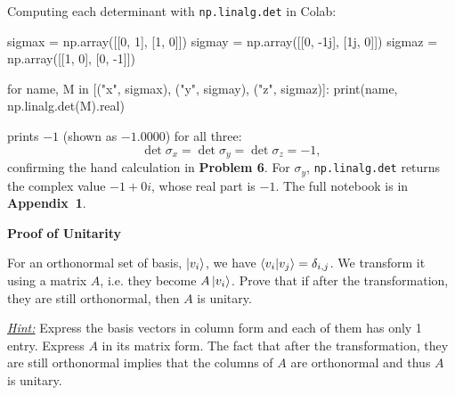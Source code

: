 \documentclass[a4paper, 10pt]{article}
\begin{document}
\begin{solution}
	\noindent Computing each determinant with \texttt{np.linalg.det} in Colab:
	\begin{codingbox}
sigmax = np.array([[0,  1], [1,  0]])
sigmay = np.array([[0, -1j], [1j, 0]])
sigmaz = np.array([[1,  0], [0, -1]])

for name, M in [("x", sigmax), ("y", sigmay), ("z", sigmaz)]:
    print(name, np.linalg.det(M).real)
\end{codingbox}
	\noindent prints \( -1 \) (shown as \( -1.0000 \)) for all three:
	\[
		\det \sigma_x = \det \sigma_y = \det \sigma_z = -1,
	\]
	confirming the hand calculation in \textbf{Problem 6}.
	For \( \sigma_y \), \texttt{np.linalg.det} returns the complex value \( -1 + 0i \), whose real part is \( -1 \).
	The full notebook is in \textbf{Appendix~1}.
\end{solution}

\newpage

\begin{problem}
\textbf{Proof of Unitarity}
\par For an orthonormal set of basis, \( \ket{v_i} \), we have \( \braket{v_i \vert v_j} = \delta_{i,j} \).
We transform it using a matrix \( A \), i.e. they become \( A\ket{v_i} \).
Prove that if after the transformation, they are still orthonormal, then \( A \) is unitary.
\par \underline{\textit{Hint:}} Express the basis vectors in column form and each of them has only 1 entry.
Express \( A \) in its matrix form. The fact that after the transformation,
they are still orthonormal implies that the columns of \( A \) are orthonormal and thus \( A \) is unitary.
\end{problem}
\end{document}
